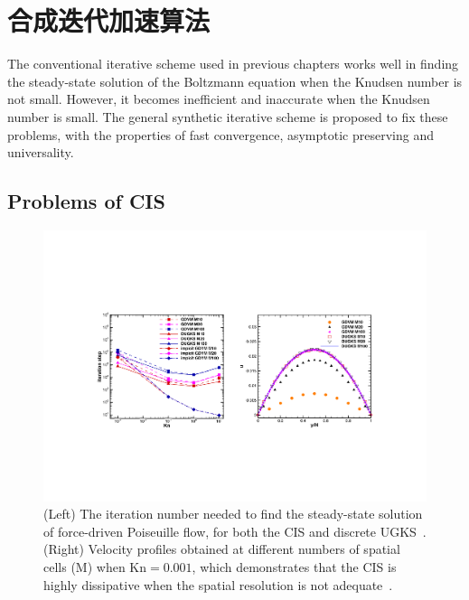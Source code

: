 \chapter{合成迭代加速算法}
\label{chap:GSIS}




The conventional iterative scheme used in previous chapters works well in finding the steady-state solution of the Boltzmann equation when the Knudsen number is not small.  However, it becomes inefficient and inaccurate when the Knudsen number is small. The  general synthetic iterative scheme is proposed to fix these problems, with the properties of fast convergence, asymptotic preserving and universality. 


\section{Problems of CIS}

\begin{figure}[t]
	\centering
	\includegraphics[scale=0.7]{GSIS/IMG/Peng_CAF}
	\caption{ (Left) The iteration number needed to find the steady-state solution of force-driven Poiseuille flow, for both the CIS and discrete UGKS~\cite{guo2013discrete}. (Right) Velocity profiles obtained at different numbers of spatial cells (M) when $\text{Kn}=0.001$, which demonstrates that the CIS is highly dissipative when the spatial resolution is not adequate~\cite{WANG201833}.  }
	\label{fig:Peng_CAF}
\end{figure}

